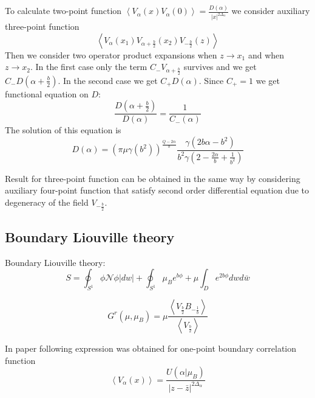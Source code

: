 \documentclass[12pt]{article}
\begin{document}
To calculate two-point function
$\left<V_{\alpha}(x)V_{\alpha}(0)\right>=\frac{D(\alpha)}{|x|^{2\Delta_{\alpha}}}$ we consider
auxiliary three-point function
\begin{equation}
  \label{eq:38}
  \left<V_{\alpha}(x_{1})V_{\alpha+\frac{b}{2}}(x_{2})V_{-\frac{b}{2}}(z)\right>
\end{equation}
Then we consider two operator product expansions when $z\to x_{1}$ and when $z\to x_{2}$. In the
first case only the term $C_{-} V_{\alpha+\frac{b}{2}}$ survives and we get
$C_{-}D\left(\alpha+\frac{b}{2}\right)$. In the second case we get $C_{+}D(\alpha)$. Since $C_{+}=1$
we get functional equation on $D$:
\begin{equation}
  \label{eq:57}
  \frac{D\left(\alpha+\frac{b}{2}\right)}{D(\alpha)}=\frac{1}{C_{-}(\alpha)}
\end{equation}
The solution of this equation is
\begin{equation}
  \label{eq:69}
  D(\alpha)=(\pi\mu\gamma(b^{2}))^{\frac{Q-2\alpha}{b}} \frac{\gamma(2b\alpha-b^{2})}{b^{2}\gamma\left(2-\frac{2\alpha}{b}+\frac{1}{b^{2}}\right)}
\end{equation}

Result for three-point function can be obtained in the same way by considering auxiliary four-point
function that satisfy second order differential equation due to degeneracy of the field $V_{-\frac{b}{2}}$.

\subsection{Boundary Liouville theory}
\label{sec:bound-liouv-theory}



Boundary Liouville theory:
\begin{equation}
  \label{eq:12}
  S=\oint_{S^{1}} \phi \mathcal{N} \phi |dw| + \oint_{S^{1}} \mu_{B} e^{b\phi} + \mu\int_{D} e^{2b\phi} dw d\bar{w}
\end{equation}

\begin{equation}
  \label{eq:11}
  G^{r}(\mu,\mu_{B}) = \mu \frac{\left<V_{\frac{b}{2}} B_{-\frac{1}{b}}\right>}{\left<V_{\frac{b}{2}}\right>}
\end{equation}

In paper \cite{fateev2000boundary} following expression was obtained for one-point boundary
correlation function
\begin{equation}
  \label{eq:22}
  \left<V_{\alpha}(x)\right>=\frac{U(\alpha|\mu_{B})}{|z-\bar z|^{2\Delta_{\alpha}}}
\end{equation}
\end{document}
